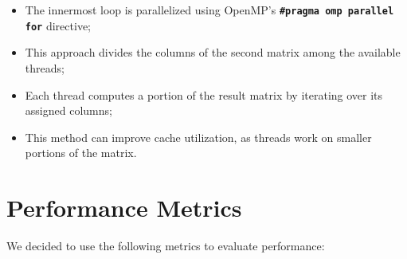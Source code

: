\documentclass{article}
\begin{document}
\begin{itemize}
\item The innermost loop is parallelized using OpenMP's \textbf{\lstinline{#pragma omp parallel for}} directive;
\item This approach divides the columns of the second matrix among the available threads;
\item Each thread computes a portion of the result matrix by iterating over its assigned columns;
\item This method can improve cache utilization, as threads work on smaller portions of the matrix.
\end{itemize}


\section{Performance Metrics}

We decided to use the following metrics to evaluate performance:
\end{document}
